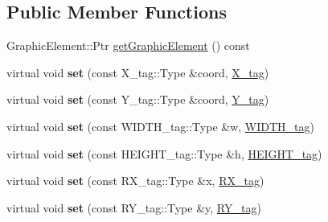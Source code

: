 \subsection*{Public Member Functions}
\begin{DoxyCompactItemize}
\item 
GraphicElement::Ptr \hyperlink{classsambag_1_1disco_1_1svg_1_1_svg_rect_a371add36265c803afc6d1d41403a4690}{getGraphicElement} () const 
\item 
\hypertarget{classsambag_1_1disco_1_1svg_1_1_svg_rect_ad0c483c304a55b6cb0d0eb8a357c6b0d}{
virtual void {\bfseries set} (const X\_\-tag::Type \&coord, \hyperlink{structsambag_1_1disco_1_1svg_1_1_svg_rect_1_1_x__tag}{X\_\-tag})}
\label{classsambag_1_1disco_1_1svg_1_1_svg_rect_ad0c483c304a55b6cb0d0eb8a357c6b0d}

\item 
\hypertarget{classsambag_1_1disco_1_1svg_1_1_svg_rect_af57c645d66676b4424c39c000568e6a7}{
virtual void {\bfseries set} (const Y\_\-tag::Type \&coord, \hyperlink{structsambag_1_1disco_1_1svg_1_1_svg_rect_1_1_y__tag}{Y\_\-tag})}
\label{classsambag_1_1disco_1_1svg_1_1_svg_rect_af57c645d66676b4424c39c000568e6a7}

\item 
\hypertarget{classsambag_1_1disco_1_1svg_1_1_svg_rect_acc9f6e654790cee577766040f5fa3f8d}{
virtual void {\bfseries set} (const WIDTH\_\-tag::Type \&w, \hyperlink{structsambag_1_1disco_1_1svg_1_1_svg_rect_1_1_w_i_d_t_h__tag}{WIDTH\_\-tag})}
\label{classsambag_1_1disco_1_1svg_1_1_svg_rect_acc9f6e654790cee577766040f5fa3f8d}

\item 
\hypertarget{classsambag_1_1disco_1_1svg_1_1_svg_rect_a424bac3cb498825a3b46581c108d11f3}{
virtual void {\bfseries set} (const HEIGHT\_\-tag::Type \&h, \hyperlink{structsambag_1_1disco_1_1svg_1_1_svg_rect_1_1_h_e_i_g_h_t__tag}{HEIGHT\_\-tag})}
\label{classsambag_1_1disco_1_1svg_1_1_svg_rect_a424bac3cb498825a3b46581c108d11f3}

\item 
\hypertarget{classsambag_1_1disco_1_1svg_1_1_svg_rect_af2f72135d0a6d1bc2110c5c0cfff7bd8}{
virtual void {\bfseries set} (const RX\_\-tag::Type \&x, \hyperlink{structsambag_1_1disco_1_1svg_1_1_svg_rect_1_1_r_x__tag}{RX\_\-tag})}
\label{classsambag_1_1disco_1_1svg_1_1_svg_rect_af2f72135d0a6d1bc2110c5c0cfff7bd8}

\item 
\hypertarget{classsambag_1_1disco_1_1svg_1_1_svg_rect_ac93f66f566f96740d5bd627272f37c6c}{
virtual void {\bfseries set} (const RY\_\-tag::Type \&y, \hyperlink{structsambag_1_1disco_1_1svg_1_1_svg_rect_1_1_r_y__tag}{RY\_\-tag})}
\label{classsambag_1_1disco_1_1svg_1_1_svg_rect_ac93f66f566f96740d5bd627272f37c6c}

\end{DoxyCompactItemize}
